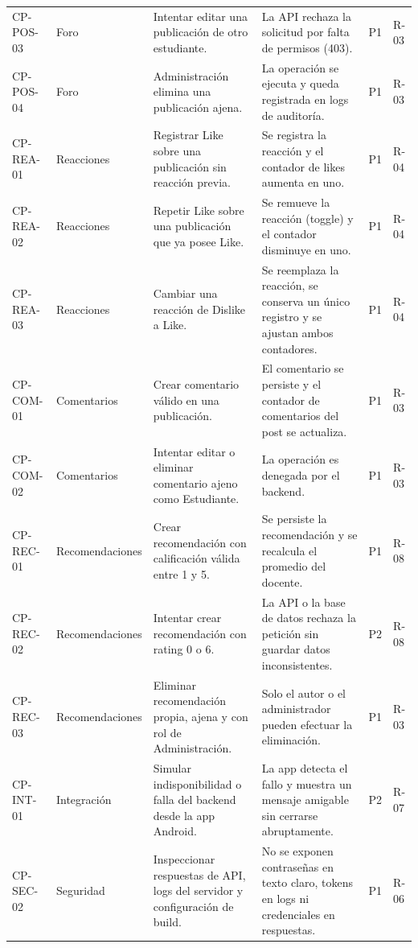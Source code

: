 \documentclass[11pt,a4paper]{article}
\begin{document}
\begin{longtable}{p{1.25cm}p{2.5cm}p{3.55cm}p{4.35cm}p{0.7cm}p{0.95cm}}
CP-POS-03 & Foro & Intentar editar una publicación de otro estudiante. & La API rechaza la solicitud por falta de permisos (403). & P1 & R-03\\
\rowcolor{lightgray}CP-POS-04 & Foro & Administración elimina una publicación ajena. & La operación se ejecuta y queda registrada en logs de auditoría. & P1 & R-03\\
CP-REA-01 & Reacciones & Registrar Like sobre una publicación sin reacción previa. & Se registra la reacción y el contador de likes aumenta en uno. & P1 & R-04\\
\rowcolor{lightgray}CP-REA-02 & Reacciones & Repetir Like sobre una publicación que ya posee Like. & Se remueve la reacción (toggle) y el contador disminuye en uno. & P1 & R-04\\
CP-REA-03 & Reacciones & Cambiar una reacción de Dislike a Like. & Se reemplaza la reacción, se conserva un único registro y se ajustan ambos contadores. & P1 & R-04\\
\rowcolor{lightgray}CP-COM-01 & Comentarios & Crear comentario válido en una publicación. & El comentario se persiste y el contador de comentarios del post se actualiza. & P1 & R-03\\
CP-COM-02 & Comentarios & Intentar editar o eliminar comentario ajeno como Estudiante. & La operación es denegada por el backend. & P1 & R-03\\
\rowcolor{lightgray}CP-REC-01 & Recomendaciones & Crear recomendación con calificación válida entre 1 y 5. & Se persiste la recomendación y se recalcula el promedio del docente. & P1 & R-08\\
CP-REC-02 & Recomendaciones & Intentar crear recomendación con rating 0 o 6. & La API o la base de datos rechaza la petición sin guardar datos inconsistentes. & P2 & R-08\\
\rowcolor{lightgray}CP-REC-03 & Recomendaciones & Eliminar recomendación propia, ajena y con rol de Administración. & Solo el autor o el administrador pueden efectuar la eliminación. & P1 & R-03\\
CP-INT-01 & Integración & Simular indisponibilidad o falla del backend desde la app Android. & La app detecta el fallo y muestra un mensaje amigable sin cerrarse abruptamente. & P2 & R-07\\
\rowcolor{lightgray}CP-SEC-02 & Seguridad & Inspeccionar respuestas de API, logs del servidor y configuración de build. & No se exponen contraseñas en texto claro, tokens en logs ni credenciales en respuestas. & P1 & R-06\\
\end{longtable}
\normalsize
\end{document}
